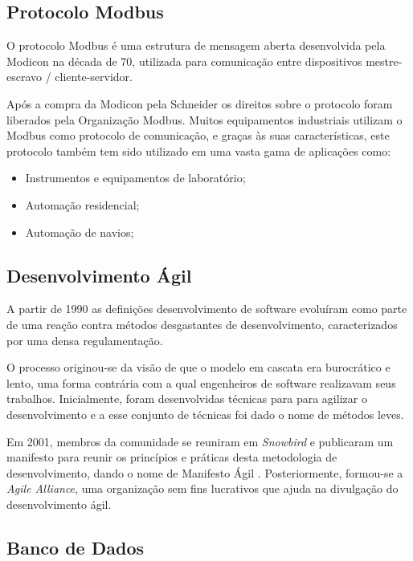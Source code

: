 \newpage
\subsection{Protocolo Modbus}

O protocolo Modbus é uma estrutura de mensagem aberta desenvolvida pela Modicon na década de 70, utilizada para comunicação entre  dispositivos mestre-escravo / cliente-servidor. \cite{modicon1996}

Após a compra da Modicon pela Schneider os direitos sobre o protocolo foram liberados pela Organização Modbus. Muitos equipamentos industriais utilizam o Modbus como protocolo de comunicação, e graças às suas características, este protocolo também tem sido utilizado em uma vasta gama de aplicações como:

\begin{itemize}
\item  Instrumentos e equipamentos de laboratório;
\item  Automação residencial;
\item  Automação de navios;
\end{itemize}

\subsection{Desenvolvimento Ágil}

A partir de 1990 as definições desenvolvimento de software evoluíram como parte de uma reação contra métodos desgastantes de desenvolvimento, caracterizados por uma densa regulamentação. 

O processo originou-se da visão de que o modelo em cascata era burocrático e lento, uma forma contrária com a qual engenheiros de software realizavam seus trabalhos.
Inicialmente, foram desenvolvidas técnicas para para agilizar o desenvolvimento e a esse conjunto de técnicas foi dado o nome de métodos leves. 

Em 2001, membros da comunidade se reuniram em \textit{Snowbird} e publicaram um manifesto para reunir os princípios e práticas desta metodologia de desenvolvimento, dando o nome de Manifesto Ágil \cite{beck2001manifesto}. Posteriormente, formou-se a \textit{Agile Alliance}, uma organização sem fins lucrativos que ajuda na divulgação do desenvolvimento ágil.

\newpage
\subsection{Banco de Dados}

